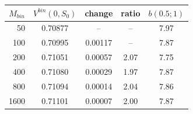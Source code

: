 \begin{tabular}{rcccc}
\toprule
$M_{bin}$ & $V^{bin}(0,S_0)$ & change & ratio & $b(0.5;1)$ \\
\midrule
50 & 0.70877 & -- & -- & 7.97 \\
100 & 0.70995 & 0.00117 & -- & 7.87 \\
200 & 0.71051 & 0.00057 & 2.07 & 7.75 \\
400 & 0.71080 & 0.00029 & 1.97 & 7.87 \\
800 & 0.71094 & 0.00014 & 2.04 & 7.86 \\
1600 & 0.71101 & 0.00007 & 2.00 & 7.87 \\
\bottomrule
\end{tabular}
